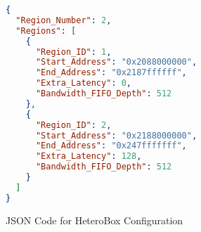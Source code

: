 \begin{figure}[t]
\centering
\footnotesize
\begin{lstlisting}[language=json,firstnumber=1]
{
  "Region_Number": 2,
  "Regions": [
    {
      "Region_ID": 1,
      "Start_Address": "0x2088000000",
      "End_Address": "0x2187ffffff",
      "Extra_Latency": 0,
      "Bandwidth_FIFO_Depth": 512
    },
    {
      "Region_ID": 2,
      "Start_Address": "0x2188000000",
      "End_Address": "0x247fffffff",
      "Extra_Latency": 128,
      "Bandwidth_FIFO_Depth": 512
    }
  ]
}
\end{lstlisting}
\caption{JSON Code for HeteroBox Configuration}
\label{fig:heterobox_config}
\end{figure}